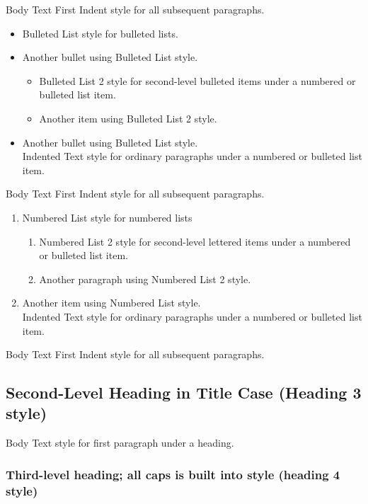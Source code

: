 Body Text First Indent style for all subsequent paragraphs.
\begin{itemize}
    \item Bulleted List style for bulleted lists.
    \item Another bullet using Bulleted List style.
    \begin{itemize}
        \item Bulleted List 2 style for second-level bulleted items under a numbered or bulleted list item.
        \item Another item using Bulleted List 2 style.
    \end{itemize}
    \item Another bullet using Bulleted List style.\\
    Indented Text style for ordinary paragraphs under a numbered or bulleted list item.
\end{itemize}

\noindent Body Text First Indent style for all subsequent paragraphs.

\begin{enumerate}
    \item Numbered List style for numbered lists
    \begin{enumerate}
        \item Numbered List 2 style for second-level lettered items under a numbered or bulleted list item.
        \item Another paragraph using Numbered List 2 style.
    \end{enumerate}
    \item Another item using Numbered List style.\\
    Indented Text style for ordinary paragraphs under a numbered or bulleted list item.
\end{enumerate}

\noindent Body Text First Indent style for all subsequent paragraphs.

\subsection{Second-Level Heading in Title Case (Heading 3 style)}

\indent Body Text style for first paragraph under a heading.

\subsubsection{Third-level heading; all caps is built into style (heading 4 style)}

